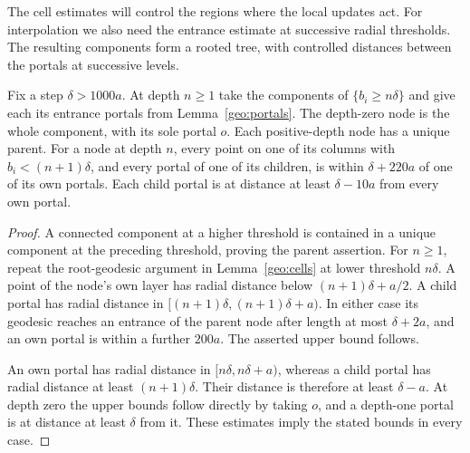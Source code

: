 The cell estimates will control the regions where the local updates act.
For interpolation we also need the entrance estimate at successive radial
thresholds. The resulting components form a rooted tree, with controlled
distances between the portals at successive levels.

\begin{lemma}\label{geo:portal-levels}
Fix a step $\delta>1000a$.  At depth $n\ge1$ take the components of
$\{b_i\ge n\delta\}$ and give each its entrance portals from
Lemma~\ref{geo:portals}.  The depth-zero node is the whole component,
with its sole portal $o$.  Each positive-depth node has a unique parent.
For a node at depth $n$, every point on one of its columns with
$b_i<(n+1)\delta$, and every portal of one of its children, is within
$\delta+220a$ of one of its own portals.  Each child portal is at distance
at least $\delta-10a$ from every own portal.
\end{lemma}

\begin{proof}
A connected component at a higher threshold is contained in a unique
component at the preceding threshold, proving the parent assertion.
For $n\ge1$, repeat the root-geodesic argument in
Lemma~\ref{geo:cells} at lower threshold $n\delta$.  A point of the
node's own layer has radial distance below $(n+1)\delta+a/2$.  A child
portal has radial distance in
$[(n+1)\delta,(n+1)\delta+a)$.  In either case its geodesic reaches an
entrance of the parent node after length at most $\delta+2a$, and an
own portal is within a further $200a$.  The asserted upper bound follows.

An own portal has radial distance in $[n\delta,n\delta+a)$, whereas a
child portal has radial distance at least $(n+1)\delta$.  Their distance
is therefore at least $\delta-a$.  At depth zero the upper bounds follow
directly by taking $o$, and a depth-one portal is at distance at least
$\delta$ from it.  These estimates imply the stated bounds in every case.
\end{proof}
